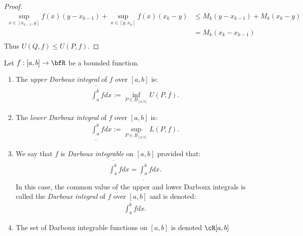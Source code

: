 \documentclass[10pt,twoside,openany]{memoir}
\begin{document}
\begin{proof}
                \begin{equation*}
                \begin{split}
                    \sup_{x \in [x_{k-1},y]} f(x)(y - x_{k-1}) + \sup_{x \in [y,x_{k}]} f(x)(x_{k} - y)
                    & \leq M_k(y-x_{k-1}) + M_k(x_k - y) \\
                    & = M_k(x_k - x_{k-1}) \\
                \end{split}
                \end{equation*}
            Thus $U(Q,f) \leq U(P,f)$.
        \end{proof}

    \begin{definition}
        Let $f:[a,b] \rightarrow \bfR$ be a bounded function.
            \begin{enumerate}[label = (\arabic*),itemsep=1pt,topsep=3pt]
                \item The \textit{upper Darboux integral} of $f$ over $[a,b]$ is:
                    \begin{equation*}
                    \begin{split}
                        \overline{\int_{a}^{b}}f dx :=\inf_{P \in B_{[a,b]}}U(P,f).
                    \end{split}
                    \end{equation*}
                \item The \textit{lower Darboux integral} of $f$ over $[a,b]$ is:
                \begin{equation*}
                \begin{split}
                    \underline{\int_{a}^{b}}f dx :=\sup_{P \in B_{[a,b]}}L(P,f).
                    \end{split}
                    \end{equation*}

                \item We say that $f$ is \textit{Darboux integrable} on $[a,b]$ provided that:
                    \begin{equation*}
                    \begin{split}
                        \overline{\int_{a}^{b}}f dx = \underline{\int_{a}^{b}}f dx .
                    \end{split}
                    \end{equation*}
                In this case, the common value of the upper and lower Darboux integrals is called the \textit{Darboux integral} of $f$ over $[a,b]$ and is denoted:
                    \begin{equation*}
                    \begin{split}
                        \int_a^b f dx.
                    \end{split}
                    \end{equation*}

                \item The set of Darboux integrable functions on $[a,b]$ is denoted $\cR[a,b]$
            \end{enumerate}
    \end{definition}
\end{document}
